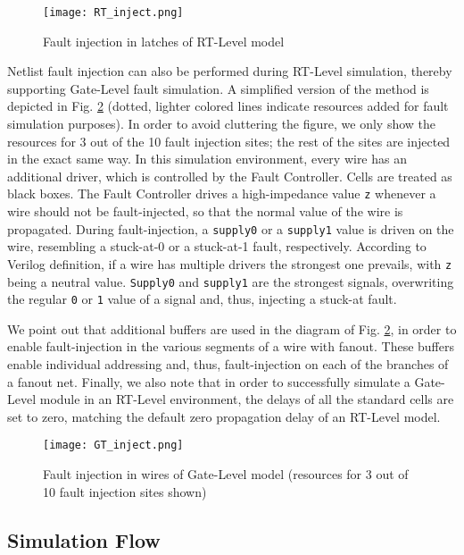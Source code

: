 \documentclass[12pt]{yalephd}
\begin{document}
\begin{figure}[!ht]
\centering
\texttt{[image: RT\_inject.png]}
\caption{Fault injection in latches of RT-Level model}
\label{sC2RT-inject}
\end{figure}

 Netlist fault injection can also be performed during RT-Level simulation, thereby supporting Gate-Level fault simulation. A simplified version of the method is depicted in Fig. \ref{sC2GT-inject} (dotted, lighter colored lines indicate resources added for fault simulation purposes). In order to avoid cluttering the figure, we only show the resources for 3 out of the 10 fault injection sites; the rest of the sites are injected in the exact same way. In this simulation environment, every wire has an additional driver, which is controlled by the Fault Controller. Cells are treated as black boxes. The Fault Controller drives a high-impedance value \texttt{z} whenever a wire should not be fault-injected, so that the normal value of the wire is propagated. During fault-injection, a \texttt{supply0} or a \texttt{supply1} value is driven on the wire, resembling a stuck-at-0 or a stuck-at-1 fault, respectively. According to Verilog definition, if a wire has multiple drivers the strongest one prevails, with \texttt{z} being a neutral value. \texttt{Supply0} and \texttt{supply1} are the strongest signals, overwriting the regular \texttt{0} or \texttt{1} value of a signal and, thus, injecting a stuck-at fault.

We point out that additional buffers are used in the diagram of Fig. \ref{sC2GT-inject}, in order to enable fault-injection in the various segments of a wire with fanout. These buffers enable individual addressing and, thus, fault-injection on each of the branches of a fanout net. Finally, we also note that in order to successfully simulate a Gate-Level module in an RT-Level environment, the delays of all the standard cells are set to zero, matching the default zero propagation delay of an RT-Level model.

\begin{figure}[!ht]
\centering
\texttt{[image: GT\_inject.png]}
\caption{Fault injection in wires of Gate-Level model (resources for 3 out of 10 fault injection sites shown)}
\label{sC2GT-inject}
\end{figure}

\subsection{Simulation Flow}
\end{document}
